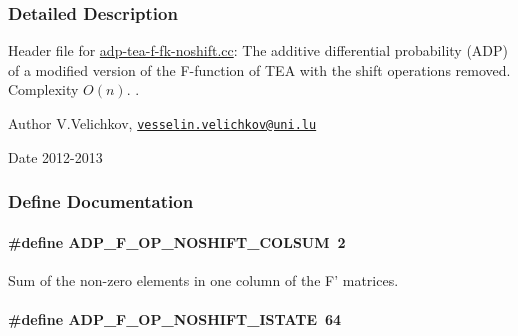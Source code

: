 \subsubsection{\-Detailed \-Description}
\-Header file for \hyperlink{adp-tea-f-fk-noshift_8cc}{adp-\/tea-\/f-\/fk-\/noshift.\-cc}\-: \-The additive differential probability (\-A\-D\-P) of a modified version of the \-F-\/function of \-T\-E\-A with the shift operations removed. \-Complexity $O(n)$. . \begin{DoxyAuthor}{\-Author}
\-V.\-Velichkov, \href{mailto:vesselin.velichkov@uni.lu}{\tt vesselin.\-velichkov@uni.\-lu} 
\end{DoxyAuthor}
\begin{DoxyDate}{\-Date}
2012-\/2013 
\end{DoxyDate}


\subsubsection{\-Define \-Documentation}
\hypertarget{adp-tea-f-fk-noshift_8hh_af415797182c8628abe91c502d37a5658}{
\paragraph[{\-A\-D\-P\-\_\-\-F\-\_\-\-O\-P\-\_\-\-N\-O\-S\-H\-I\-F\-T\-\_\-\-C\-O\-L\-S\-U\-M}]{\setlength{\rightskip}{0pt plus 5cm}\#define {\bf \-A\-D\-P\-\_\-\-F\-\_\-\-O\-P\-\_\-\-N\-O\-S\-H\-I\-F\-T\-\_\-\-C\-O\-L\-S\-U\-M}~2}}\label{adp-tea-f-fk-noshift_8hh_af415797182c8628abe91c502d37a5658}
\-Sum of the non-\/zero elements in one column of the \-F' matrices. \hypertarget{adp-tea-f-fk-noshift_8hh_a299904aed650e7b3a81f84077b3c2162}{
\paragraph[{\-A\-D\-P\-\_\-\-F\-\_\-\-O\-P\-\_\-\-N\-O\-S\-H\-I\-F\-T\-\_\-\-I\-S\-T\-A\-T\-E}]{\setlength{\rightskip}{0pt plus 5cm}\#define {\bf \-A\-D\-P\-\_\-\-F\-\_\-\-O\-P\-\_\-\-N\-O\-S\-H\-I\-F\-T\-\_\-\-I\-S\-T\-A\-T\-E}~64}}\label{adp-tea-f-fk-noshift_8hh_a299904aed650e7b3a81f84077b3c2162}
